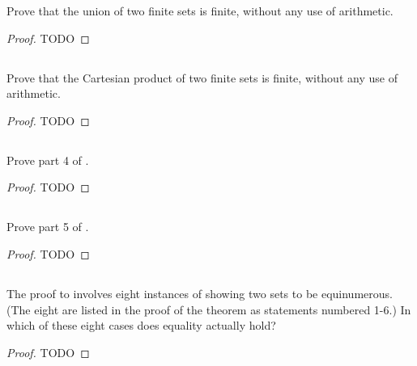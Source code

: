 \documentclass{report}
\begin{document}
  Prove that the union of two finite sets is finite, without any use of
    arithmetic.

  \begin{proof}
    TODO
  \end{proof}

\subsection{}%

  Prove that the Cartesian product of two finite sets is finite, without any use
    of arithmetic.

  \begin{proof}
    TODO
  \end{proof}

\subsection{}%

  Prove part 4 of .

  \begin{proof}
    TODO
  \end{proof}

\subsection{}%

  Prove part 5 of .

  \begin{proof}
    TODO
  \end{proof}

\subsection{}%

  The proof to  involves eight instances of showing two
    sets to be equinumerous.
  (The eight are listed in the proof of the theorem as statements numbered 1-6.)
  In which of these eight cases does equality actually hold?

  \begin{proof}
    TODO
  \end{proof}
\end{document}
